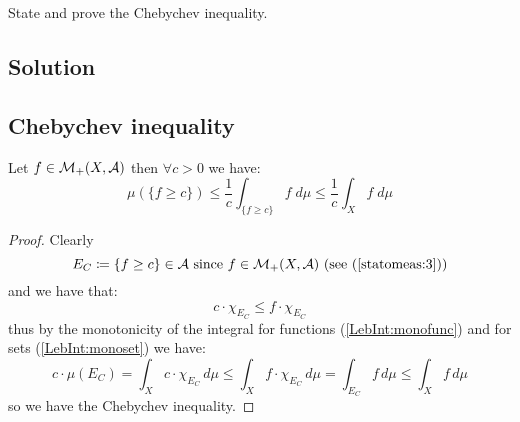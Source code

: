 

\question

State and prove the Chebychev inequality.

\subsection*{Solution}

\subsection{Chebychev inequality}\label{ChebIneq}

Let $f\in\mathcal{M}_+(X,\mathcal{A})$ then $\forall c>0$ we have:
\[
    \mu( \{  f\geq c \}) \leq \frac{1}{c} \int_{ \{ f \geq c \}} f\; d\mu \leq \frac{1}{c} \int_X f\; d\mu    
\]
\begin{proof}
    Clearly
    \[
        E_C \coloneqq \{ f\geq c \} \in \mathcal{A} \text{ since } f\in\mathcal{M}_+(X,\mathcal{A}) \text{ (see (\ref{statomeas:3}))} 
    \]
    and we have that:
    \[
        c\cdot \chi_{E_C} \leq f \cdot \chi_{E_C}    
    \]
    thus by the monotonicity of the integral for functions (\ref{LebInt:monofunc}) and for sets (\ref{LebInt:monoset}) we have:
    \[
        c\cdot \mu(E_C) = \int_ X c\cdot \chi_{E_C} \, d\mu \leq \int_ X f \cdot \chi_{E_C} \, d\mu = \int_{E_C} f \, d\mu \leq \int_X f \, d\mu
    \]
    so we have the Chebychev inequality.
\end{proof}